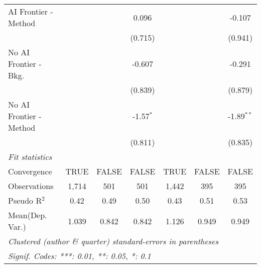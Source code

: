 \begin{tabular}{lcccccc}
   AI Frontier - Method    &         &            & 0.096       &         &             & -0.107\\   
                           &         &            & (0.715)     &         &             & (0.941)\\   
   No AI Frontier - Bkg.   &         &            & -0.607      &         &             & -0.291\\   
                           &         &            & (0.839)     &         &             & (0.879)\\   
   No AI Frontier - Method &         &            & -1.57$^{*}$ &         &             & -1.89$^{**}$\\   
                           &         &            & (0.811)     &         &             & (0.835)\\   
   \midrule
   \emph{Fit statistics}\\
   Convergence             &TRUE     & FALSE      & FALSE       & TRUE    & FALSE       & FALSE\\  
   Observations            & 1,714   & 501        & 501         & 1,442   & 395         & 395\\  
   Pseudo R$^2$            & 0.42    & 0.49       & 0.50        & 0.43    & 0.51        & 0.53\\  
Mean(Dep. Var.) & 1.039 & 0.842 & 0.842 & 1.126 & 0.949 & 0.949 \\
   \midrule \midrule
   \multicolumn{7}{l}{\emph{Clustered (author \& quarter) standard-errors in parentheses}}\\
   \multicolumn{7}{l}{\emph{Signif. Codes: ***: 0.01, **: 0.05, *: 0.1}}\\
\end{tabular}
\par\endgroup
